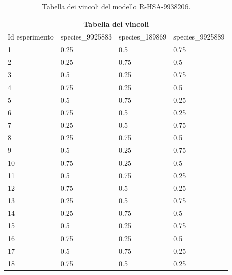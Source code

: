 \begin{table}
\centering
\begin{tabular}{ |p{2cm}||p{3cm}|p{3cm}|p{3cm}|  }
 \hline
 \multicolumn{4}{|c|}{Tabella dei vincoli} \\
 \hline
 Id esperimento&species\_9925883&species\_189869  &species\_9925889\\
 \hline
 1 & 0.25 & 0.5 & 0.75\\
 \hline
 2 & 0.25 & 0.75 & 0.5 \\
 \hline
 3 & 0.5 & 0.25 & 0.75\\
 \hline
 4 & 0.75 & 0.25 & 0.5\\
 \hline
 5 & 0.5 & 0.75 & 0.25\\
 \hline
 6 & 0.75 & 0.5 & 0.25\\
 \hline
 7 & 0.25 & 0.5 & 0.75\\
 \hline
 8 & 0.25 & 0.75 & 0.5 \\
 \hline
 9 & 0.5 & 0.25 & 0.75\\
 \hline
 10 & 0.75 & 0.25 & 0.5\\
 \hline
11 & 0.5 & 0.75 & 0.25\\
 \hline
 12 & 0.75 & 0.5 & 0.25\\
 \hline
  13 & 0.25 & 0.5 & 0.75\\
 \hline
 14 & 0.25 & 0.75 & 0.5 \\
 \hline
 15 & 0.5 & 0.25 & 0.75\\
 \hline
 16 & 0.75 & 0.25 & 0.5\\
 \hline
 17 & 0.5 & 0.75 & 0.25\\
 \hline
 18 & 0.75 & 0.5 & 0.25\\
 \hline 
\end{tabular}
\caption{Tabella dei vincoli del modello R-HSA-9938206.}
\label{table:vin-R-HSA-9938206}
\end{table}

